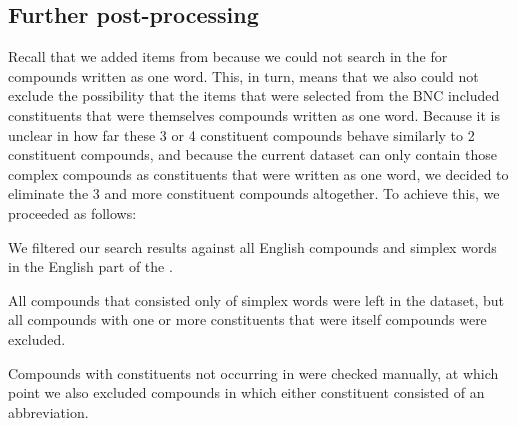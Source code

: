 
\subsection{Further post-processing}
\label{sec:postData}

Recall that we added items from  because we could not search in
the  for compounds written as one word. This, in turn, means that
we also could not exclude the possibility that the items that were selected from the
BNC included constituents that were themselves compounds written as
one word. Because it is unclear
in how far these 3 or 4 constituent compounds behave
similarly to 2 constituent compounds, and because the current dataset
can only contain those complex compounds as constituents that were
written as one word, we decided to eliminate the 3 and more constituent
compounds altogether. To achieve this, we proceeded as follows:
\begin{inparaenum}[(1)]
\item We filtered our search results
against all English compounds and simplex words in the English part of
the .
\item All compounds that consisted only of simplex words were left in
  the dataset, but all compounds with one or more constituents that were itself compounds
  were excluded.
\item Compounds with constituents not occurring in  were checked
manually, at which point we also excluded compounds in which either
constituent consisted of an abbreviation. 
\end{inparaenum}


